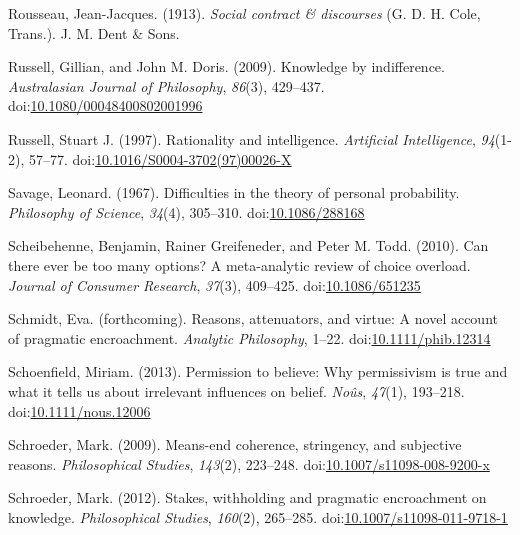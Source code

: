 \documentclass[
  10pt,
  letterpaper,
  twoside]{scrbook}
\newlength{\cslhangindent}
\newenvironment{CSLReferences}[2] %
 {\begin{list}{}{%
  \setlength{\itemindent}{0pt}
  \setlength{\leftmargin}{0pt}
  \setlength{\parsep}{0pt}
  \ifodd #1
   \setlength{\leftmargin}{\cslhangindent}
   \setlength{\itemindent}{-1\cslhangindent}
  \fi
  \setlength{\itemsep}{#2\baselineskip}}}
 {\end{list}}
\begin{document}
\begin{CSLReferences}{1}{0}
Rousseau, Jean-Jacques. (1913). \emph{Social contract \& discourses} (G.
D. H. Cole, Trans.). J. M. Dent \& Sons.

Russell, Gillian, and John M. Doris. (2009). Knowledge by indifference.
\emph{Australasian Journal of Philosophy}, \emph{86}(3), 429--437.
doi:\href{https://doi.org/10.1080/00048400802001996}{10.1080/00048400802001996}

Russell, Stuart J. (1997). Rationality and intelligence.
\emph{Artificial Intelligence}, \emph{94}(1-2), 57--77.
doi:\href{https://doi.org/10.1016/S0004-3702(97)00026-X}{10.1016/S0004-3702(97)00026-X}

Savage, Leonard. (1967). Difficulties in the theory of personal
probability. \emph{Philosophy of Science}, \emph{34}(4), 305--310.
doi:\href{https://doi.org/10.1086/288168}{10.1086/288168}

Scheibehenne, Benjamin, Rainer Greifeneder, and Peter M. Todd. (2010).
Can there ever be too many options? A meta-analytic review of choice
overload. \emph{Journal of Consumer Research}, \emph{37}(3), 409--425.
doi:\href{https://doi.org/10.1086/651235}{10.1086/651235}

Schmidt, Eva. (forthcoming). Reasons, attenuators, and virtue: A novel
account of pragmatic encroachment. \emph{Analytic Philosophy}, 1--22.
doi:\href{https://doi.org/10.1111/phib.12314}{10.1111/phib.12314}

Schoenfield, Miriam. (2013). Permission to believe: Why permissivism is
true and what it tells us about irrelevant influences on belief.
\emph{No{û}s}, \emph{47}(1), 193--218.
doi:\href{https://doi.org/10.1111/nous.12006}{10.1111/nous.12006}

Schroeder, Mark. (2009). Means-end coherence, stringency, and subjective
reasons. \emph{Philosophical Studies}, \emph{143}(2), 223--248.
doi:\href{https://doi.org/10.1007/s11098-008-9200-x}{10.1007/s11098-008-9200-x}

Schroeder, Mark. (2012). Stakes, withholding and pragmatic encroachment
on knowledge. \emph{Philosophical Studies}, \emph{160}(2), 265--285.
doi:\href{https://doi.org/10.1007/s11098-011-9718-1}{10.1007/s11098-011-9718-1}


\end{CSLReferences}
\end{document}
